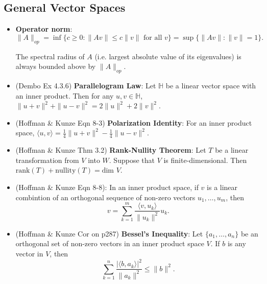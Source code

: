 \documentclass[twoside]{article}
\newcommand\bbH{\mathbb{H}}
\begin{document}
\subsection{General Vector Spaces}
\begin{itemize}
\item \textbf{Operator norm}: 
\begin{equation*} \|A\|_{op} = \inf \{ c \geq 0: \|Av\| \leq c\|v\| \text{ for all } v \} = \sup \{ \|Av \|: \| v\| = 1 \}.
\end{equation*}

The spectral radius of $A$ (i.e. largest absolute value of its eigenvalues) is always bounded above by $\|A\|_{op}$.

\item (Dembo Ex 4.3.6) \textbf{Parallelogram Law}: Let $\bbH$ be a linear vector space with an inner product. Then for any $u, v \in \bbH$, $\|u+v\|^2 + \|u-v\|^2 = 2\|u\|^2 + 2\|v\|^2$.

\item (Hoffman \& Kunze Eqn 8-3) \textbf{Polarization Identity}: For an inner product space, $\langle u, v \rangle = \frac{1}{4}\| u + v \|^2 - \frac{1}{4}\| u - v \|^2$.

\item (Hoffman \& Kunze Thm 3.2) \textbf{Rank-Nullity Theorem}: Let $T$ be a linear transformation from $V$ into $W$. Suppose that $V$ is finite-dimensional. Then $\text{rank} (T) + \text{nullity}(T) = \text{dim } V$.

\item (Hoffman \& Kunze Eqn 8-8): In an inner product space, if $v$ is a linear combintion of an orthogonal sequence of non-zero vectors $u_1, \dots, u_m$, then
\begin{equation*}
v = \sum_{k=1}^m \frac{\langle v, u_k \rangle}{\| u_k \|^2} u_k.
\end{equation*}

\item (Hoffman \& Kunze Cor on p287) \textbf{Bessel's Inequality}: Let $\{ a_1, \dots, a_n\}$ be an orthogonal set of non-zero vectors in an inner product space $V$. If $b$ is any vector in $V$, then
\begin{equation*}
\sum_{k=1}^n \frac{|\langle b, a_k \rangle|^2}{\| a_k \|^2} \leq \| b \|^2.
\end{equation*}

\end{itemize}

\end{document}
